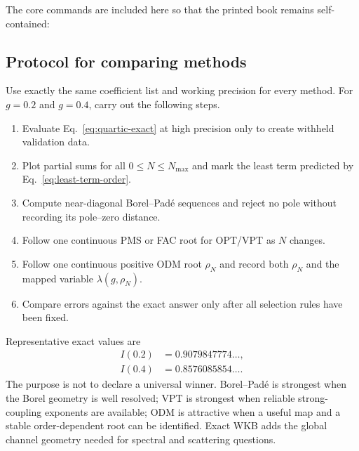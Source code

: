 The core commands are included here so that the printed book remains
self-contained:


\subsection{Protocol for comparing methods}
\label{subsec:method-comparison-protocol}

Use exactly the same coefficient list and working precision for every method.
For $g=0.2$ and $g=0.4$, carry out the following steps.
\begin{enumerate}[label=\arabic*.]
  \item Evaluate Eq.~\eqref{eq:quartic-exact} at high precision only to create
        withheld validation data.
  \item Plot partial sums for all $0\leq N\leq N_{\max}$ and mark the least
        term predicted by Eq.~\eqref{eq:least-term-order}.
  \item Compute near-diagonal Borel--Pad\'e sequences and reject no pole
        without recording its pole--zero distance.
  \item Follow one continuous PMS or FAC root for OPT/VPT as $N$ changes.
  \item Follow one continuous positive ODM root $\rho_N$ and record both
        $\rho_N$ and the mapped variable $\lambda(g,\rho_N)$.
  \item Compare errors against the exact answer only after all selection
        rules have been fixed.
\end{enumerate}
Representative exact values are
\begin{align}
  I(0.2)&=0.9079847774\ldots,\\
  I(0.4)&=0.8576085854\ldots.
  \label{eq:quartic-benchmark-values}
\end{align}
The purpose is not to declare a universal winner.  Borel--Pad\'e is strongest
when the Borel geometry is well resolved; VPT is strongest when reliable
strong-coupling exponents are available; ODM is attractive when a useful map
and a stable order-dependent root can be identified.  Exact WKB adds the
global channel geometry needed for spectral and scattering questions.

